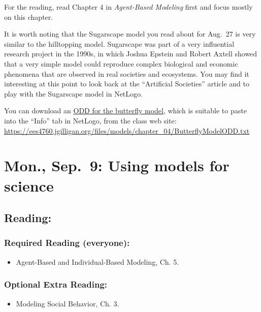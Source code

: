 \documentclass[
]{article}
\providecommand{\tightlist}{%
  \setlength{\itemsep}{0pt}\setlength{\parskip}{0pt}}
\begin{document}
For the reading, read Chapter 4 in \emph{Agent-Based Modeling} first and
focus mostly on this chapter.

It is worth noting that the Sugarscape model you read about for Aug.~27
is very similar to the hilltopping model. Sugarscape was part of a very
influential research project in the 1990s, in which Joshua Epstein and
Robert Axtell showed that a very simple model could reproduce complex
biological and economic phenomena that are observed in real societies
and ecosystems. You may find it interesting at this point to look back
at the ``Artificial Societies'' article and to play with the Sugarscape
model in NetLogo.

You can download an
\href{/files/models/chapter_04/ButterflyModelODD.txt}{ODD for the
butterfly model}, which is suitable to paste into the ``Info'' tab in
NetLogo, from the class web site:
\url{https://ees4760.jgilligan.org/files/models/chapter_04/ButterflyModelODD.txt}

\section{Mon., Sep.~9: Using models for
science}\label{mon.-sep.-9-using-models-for-science}

\subsection{Reading:}\label{reading-5}

\subsubsection{Required Reading
(everyone):}\label{required-reading-everyone-4}

\begin{itemize}
\tightlist
\item
  Agent-Based and Individual-Based Modeling, Ch. 5.
\end{itemize}

\subsubsection{Optional Extra Reading:}\label{optional-extra-reading-2}

\begin{itemize}
\tightlist
\item
  Modeling Social Behavior, Ch. 3.
\end{itemize}
\end{document}
